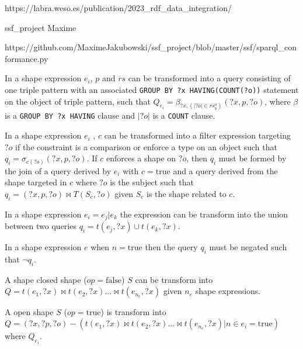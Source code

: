 https://labra.weso.es/publication/2023_rdf_data_integration/

ssf_project Maxime

https://github.com/MaximeJakubowski/ssf_project/blob/master/ssf/sparql_conformance.py

\fi

\begin{prop}\label{prop:triplePattern}
   In a shape expression $e_i$, $p$ and $rs$ can be transformed into a query consisting of one triple pattern with an associated \texttt{GROUP BY ?x HAVING(COUNT(?o))} statement on the object of triple pattern,
   such that
   $Q_{e_i} = \beta_{?x, (|?o| \in rs^a_b)}(?x, p, ?o)$,
   where $\beta$ is a \texttt{GROUP BY ?x HAVING} clause and $|?o|$ is a \texttt{COUNT} clause. 
\end{prop}

\begin{prop}
   In a shape expression $e_i$ , $c$ can be transformed into a filter expression targeting $?o$ if the constraint is a comparison or enforce a type on an object such that
   $q_{i} = \sigma_{c(?o)}(?x, p, ?o)$. 
   If $c$ enforces a shape on $?o$, then $q_i$ must be formed by the join of a query derived by $e_i$ with $c = \mathrm{true}$ and a query derived from the shape targeted in $c$ where $?o$ is the subject 
   such that $q_{i}= (?x, p, ?o) \bowtie T(S_c,?o)$ given $S_c$ is the shape related to $c$.
\end{prop}

\begin{prop}
   In a shape expression $e_i = e_j|e_k$ the expression can be transform into the union between two queries
   $q_{i} = t(e_j, ?x) \cup t(e_k, ?x)$.
\end{prop}

\begin{prop}
   In a shape expression $e$ when $n= \mathrm{true}$ then the query $q_i$ must be negated such that $\neg q_i$.
\end{prop}

\begin{prop}
   A shape closed shape ($op = \mathrm{false}$) $S$ can be transform into $Q = t(e_1, ?x) \bowtie t(e_2, ?x) ... \bowtie t(e_{n_e}, ?x)$ given $n_e$ shape expressions.
\end{prop}

\begin{prop}
   A open shape $S$ ($op = \mathrm{true}$) is transform into $Q = (?x, ?p, ?o) -  (t(e_1, ?x) \bowtie  t(e_2, ?x) ... \bowtie t(e_{n_e}, ?x)| n\in e_i = \mathrm{true}) $ where $Q_{e_i}$.
\end{prop}

